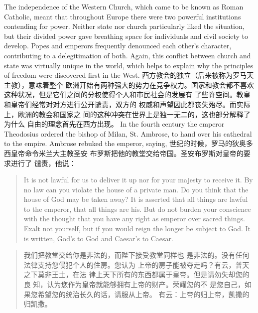 \begin{paracol}{2}
The independence of the Western Church, which came to be
known as Roman Catholic, meant that throughout Europe
there were two powerful institutions contending for power.
Neither state nor church particularly liked the situation, but
their divided power gave breathing space for individuals and
civil society to develop. Popes and emperors frequently denounced each other's character, contributing to a delegitimation of both. Again, this conflict between church and state was
virtually unique in the world, which helps to explain why the
principles of freedom were discovered first in the West.
\switchcolumn
西方教会的独立（后来被称为罗马天主教），意味着整个
欧洲开始有两种强大的势力在竞争权力。国家和教会都不喜欢
这种状况，但是它们之间的分权使得个人和市民社会的发展有
了些许空间。教皇和皇帝们经常对对方进行公开谴责，双方的
权威和声望因此都丧失殆尽。而实际上，欧洲的教会和国家之
间的这种冲突在世界上是独一无二的，这也部分解释了为什么
自由的理念首先在西方出现。
\switchcolumn*
In the fourth century the emperor Theodosius ordered the
bishop of Milan, St. Ambrose, to hand over his cathedral to the
empire. Ambrose rebuked the emperor, saying,
 世纪的时候，罗马的狄奥多西皇帝命令米兰大主教圣安
布罗斯把他的教堂交给帝国。圣安布罗斯对皇帝的要求进行了
谴责，他说：
\switchcolumn*
\begin{quote}
	It is not lawful for us to deliver it up nor for your majesty to receive it. By no law can you violate the house of a private man. Do
	you think that the house of God may be taken away? It is asserted that all things are lawful to the emperor, that all things are
	his. But do not burden your conscience with the thought that
	you have any right as emperor over sacred things. Exalt not yourself, but if you would reign the longer be subject to God. It is
	written, God's to God and Caesar's to Caesar.
\end{quote}
\switchcolumn
\begin{quote}
	我们把教堂交给你是非法的，而陛下接受教堂同样也
	是非法的。没有任何法律支持您侵犯个人的住房。您认为
	上帝的房子能被夺走吗？有云，普天之下莫非王土，在法
	律上天下所有的东西都属于皇帝。但是请勿失却您的良
	知，认为您作为皇帝就能够拥有上帝的财产。荣耀您的不
	是您自己，如果您希望您的统治长久的话，请服从上帝。
	有云：上帝的归上帝，凯撒的归凯撒。
\end{quote}

\end{paracol}

